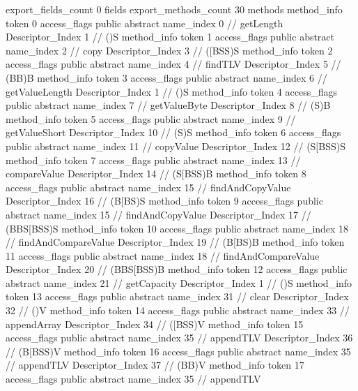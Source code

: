 {{{{			}
			export_fields_count	0
			fields {
			}
			export_methods_count	30
			methods {
				method_info {
					token	0
					access_flags	public abstract
					name_index	0		// getLength
					Descriptor_Index	1		// ()S
				}
				method_info {
					token	1
					access_flags	public abstract
					name_index	2		// copy
					Descriptor_Index	3		// ([BSS)S
				}
				method_info {
					token	2
					access_flags	public abstract
					name_index	4		// findTLV
					Descriptor_Index	5		// (BB)B
				}
				method_info {
					token	3
					access_flags	public abstract
					name_index	6		// getValueLength
					Descriptor_Index	1		// ()S
				}
				method_info {
					token	4
					access_flags	public abstract
					name_index	7		// getValueByte
					Descriptor_Index	8		// (S)B
				}
				method_info {
					token	5
					access_flags	public abstract
					name_index	9		// getValueShort
					Descriptor_Index	10		// (S)S
				}
				method_info {
					token	6
					access_flags	public abstract
					name_index	11		// copyValue
					Descriptor_Index	12		// (S[BSS)S
				}
				method_info {
					token	7
					access_flags	public abstract
					name_index	13		// compareValue
					Descriptor_Index	14		// (S[BSS)B
				}
				method_info {
					token	8
					access_flags	public abstract
					name_index	15		// findAndCopyValue
					Descriptor_Index	16		// (B[BS)S
				}
				method_info {
					token	9
					access_flags	public abstract
					name_index	15		// findAndCopyValue
					Descriptor_Index	17		// (BBS[BSS)S
				}
				method_info {
					token	10
					access_flags	public abstract
					name_index	18		// findAndCompareValue
					Descriptor_Index	19		// (B[BS)B
				}
				method_info {
					token	11
					access_flags	public abstract
					name_index	18		// findAndCompareValue
					Descriptor_Index	20		// (BBS[BSS)B
				}
				method_info {
					token	12
					access_flags	public abstract
					name_index	21		// getCapacity
					Descriptor_Index	1		// ()S
				}
				method_info {
					token	13
					access_flags	public abstract
					name_index	31		// clear
					Descriptor_Index	32		// ()V
				}
				method_info {
					token	14
					access_flags	public abstract
					name_index	33		// appendArray
					Descriptor_Index	34		// ([BSS)V
				}
				method_info {
					token	15
					access_flags	public abstract
					name_index	35		// appendTLV
					Descriptor_Index	36		// (B[BSS)V
				}
				method_info {
					token	16
					access_flags	public abstract
					name_index	35		// appendTLV
					Descriptor_Index	37		// (BB)V
				}
				method_info {
					token	17
					access_flags	public abstract
					name_index	35		// appendTLV
}}}}}
